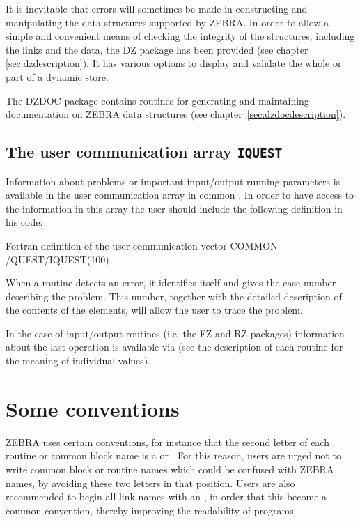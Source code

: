 It is inevitable that errors will sometimes be made in constructing and
manipulating the data structures supported by ZEBRA. 
In order to allow
a simple and convenient means of checking the integrity of the structures,
including the links and the data, the DZ package has been provided
(see chapter \ref{sec:dzdescription}).
It has various options to display and validate the whole or part of a dynamic
store.

The DZDOC package contains routines for generating and maintaining documentation
on ZEBRA data structures (see chapter~\ref{sec:dzdocdescription}).

\subsection{The user communication array {\tt IQUEST}}

Information about problems or important input/output running
parameters is available in the user communication array 
\IQUEST{} in common \Lit{/\QUEST/}. 
In order to have access to the information in this array
the user should include the following definition in his code:
\begin{XMPt}{Fortran definition of the user communication vector }
      COMMON /QUEST/IQUEST(100)
\end{XMPt}
When a routine detects an error, it identifies itself and gives the
case number describing the problem. 
This number, together with the
detailed description of the contents of the \IQUEST{} elements, will allow
the user to trace the problem.

In the case of input/output routines (i.e. the FZ and RZ packages)
information about the last operation is available via \IQUEST{}
(see the description of each routine for the meaning of individual 
\IQUEST{} values).

\section{Some conventions}

ZEBRA uses certain conventions,
for instance that the second letter of each routine or common block
name is a  or . 
For this reason, users are urged not to
write common block or routine names which could be confused with ZEBRA
names, by avoiding these two letters in that position. 
Users are also
recommended to begin all link names with an , in order that this become
a common convention, thereby improving the readability of programs.

